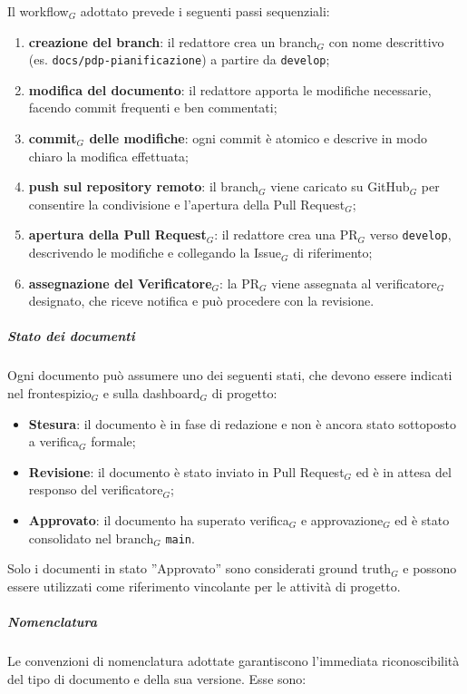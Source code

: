 \documentclass[a4paper, 10pt]{article}
\begin{document}
Il workflow$_G$ adottato prevede i seguenti passi sequenziali:
\begin{enumerate}
    \item \textbf{creazione del branch}: il redattore crea un branch$_G$ con nome descrittivo (es. \texttt{docs/pdp-pianificazione}) a partire da \texttt{develop};
    \item \textbf{modifica del documento}: il redattore apporta le modifiche necessarie, facendo commit frequenti e ben commentati;
    \item \textbf{commit$_G$ delle modifiche}: ogni commit è atomico e descrive in modo chiaro la modifica effettuata;
    \item \textbf{push sul repository remoto}: il branch$_G$ viene caricato su GitHub$_G$ per consentire la condivisione e l'apertura della Pull Request$_G$;
    \item \textbf{apertura della Pull Request$_G$}: il redattore crea una PR$_G$ verso \texttt{develop}, descrivendo le modifiche e collegando la Issue$_G$ di riferimento;
    \item \textbf{assegnazione del Verificatore$_G$}: la PR$_G$ viene assegnata al verificatore$_G$ designato, che riceve notifica e può procedere con la revisione.
\end{enumerate}

\subparagraph{Stato dei documenti}

Ogni documento può assumere uno dei seguenti stati, che devono essere indicati nel frontespizio$_G$ e sulla dashboard$_G$ di progetto:
\begin{itemize}
    \item \textbf{Stesura}: il documento è in fase di redazione e non è ancora stato sottoposto a verifica$_G$ formale;
    \item \textbf{Revisione}: il documento è stato inviato in Pull Request$_G$ ed è in attesa del responso del verificatore$_G$;
    \item \textbf{Approvato}: il documento ha superato verifica$_G$ e approvazione$_G$ ed è stato consolidato nel branch$_G$ \texttt{main}.
\end{itemize}

Solo i documenti in stato ''Approvato'' sono considerati ground truth$_G$ e possono essere utilizzati come riferimento vincolante per le attività di progetto.

\subparagraph{Nomenclatura}

Le convenzioni di nomenclatura adottate garantiscono l'immediata riconoscibilità del tipo di documento e della sua versione. Esse sono:
\end{document}
